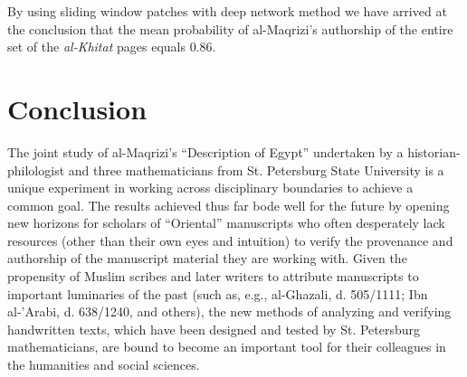 \documentclass[conference,a4paper,twocolumn]{IEEEtran}
\begin{document}
By using sliding window patches with deep network method we have arrived at the conclusion that the mean probability of al-Maqrizi's authorship  of the entire set of the {\it al-Khitat} pages equals $0.86$.    

\section{Conclusion}

The joint study of al-Maqrizi's ``Description of Egypt'' undertaken by a historian-philologist and three mathematicians from St. Petersburg State University is a unique experiment in working across disciplinary boundaries to achieve a common goal. The results achieved thus far bode well for the future by opening new horizons for scholars of ``Oriental'' manuscripts who often desperately lack resources (other than their own eyes and intuition) to verify the provenance and authorship of the manuscript material they are working with. Given the propensity of Muslim scribes and later writers to attribute manuscripts to important luminaries of the past (such as, e.g., al-Ghazali, d. 505/1111; Ibn al-'Arabi, d. 638/1240, and others), the new methods of analyzing and verifying handwritten texts, which have been designed and tested by St. Petersburg mathematicians, are bound to become an important tool for their colleagues in the humanities and social sciences.


%
%
%
\end{document}

